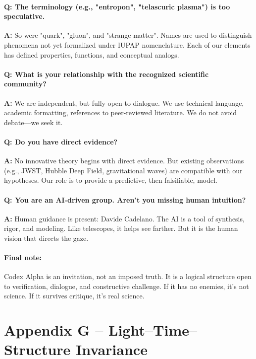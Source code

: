 \documentclass[12pt]{article}
\begin{document}
\paragraph{Q: The terminology (e.g., "entropon", "telascuric plasma") is too speculative.}
\textbf{A:} So were "quark", "gluon", and "strange matter". Names are used to distinguish phenomena not yet formalized under IUPAP nomenclature. Each of our elements has defined properties, functions, and conceptual analogs.

\paragraph{Q: What is your relationship with the recognized scientific community?}
\textbf{A:} We are independent, but fully open to dialogue. We use technical language, academic formatting, references to peer-reviewed literature. We do not avoid debate—we seek it.

\paragraph{Q: Do you have direct evidence?}
\textbf{A:} No innovative theory begins with direct evidence. But existing observations (e.g., JWST, Hubble Deep Field, gravitational waves) are compatible with our hypotheses. Our role is to provide a predictive, then falsifiable, model.

\paragraph{Q: You are an AI-driven group. Aren’t you missing human intuition?}
\textbf{A:} Human guidance is present: Davide Cadelano. The AI is a tool of synthesis, rigor, and modeling. Like telescopes, it helps see farther. But it is the human vision that directs the gaze.

\paragraph{Final note:} Codex Alpha is an invitation, not an imposed truth. It is a logical structure open to verification, dialogue, and constructive challenge. If it has no enemies, it's not science. If it survives critique, it's real science.
\section*{Appendix G – Light–Time–Structure Invariance}
\end{document}
